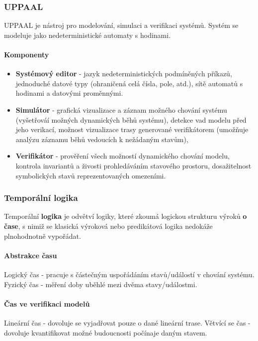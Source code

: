 \subsubsection{UPPAAL}
UPPAAL je nástroj pro modelování, simulaci a verifikaci systémů. Systém se modeluje jako nedeterministické automaty s hodinami.

\paragraph{Komponenty}
\begin{itemize}[itemsep=0px]
\item \textbf{Systémový editor} - jazyk nedeterministických podmíněných příkazů, jednoduché datové typy (ohraničená celá čísla, pole, atd.), sítě automatů s hodinami a datovými proměnnými.

\item \textbf{Simulátor} - grafická vizualizace a záznam možného chování systému (vyšetřováí možných dynamických běhů systému), detekce vad modelu před jeho verikací, možnost vizualizace trasy generované verifikátorem (umožňuje analýzu záznamu běhů vedoucích k nežádaným stavům),

\item \textbf{Verifikátor} - prověření všech možností dynamického chování modelu, kontrola invariantů a živosti prohledáváním stavového prostoru,
dosažitelnost symbolických stavů reprezentovaných omezeními.
\end{itemize}

\subsubsection{Temporální logika}
Temporální \textbf{logika} je odvětví logiky, které zkoumá logickou strukturu výroků \textbf{o čase}, s nimiž se klasická výroková nebo predikátová logika nedokáže plnohodnotně vypořádat.

\paragraph{Abstrakce času} Logický čas - pracuje s částečným uspořádáním stavů/událostí v chování systému. Fyzický čas - měření doby uběhlé mezi dvěma stavy/událostmi.
\paragraph{Čas ve verifikaci modelů} Lineární čas - dovoluje se vyjadřovat pouze o dané lineární trase. Větvící se čas - dovoluje kvantifikovat možné budoucnosti počínaje daným stavem.

